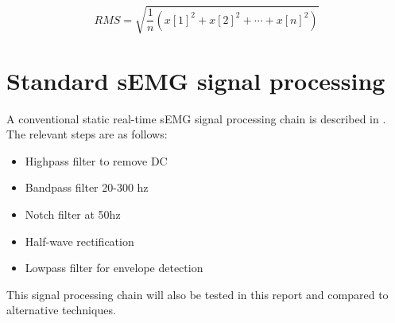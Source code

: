 \begin{equation}
    RMS = \sqrt{\frac{1}{n} (x[1]^2 + x[2]^2 + \cdots + x[n]^2)}
    \label{eq:rms}
\end{equation}

\section{Standard sEMG signal processing}\label{section:standard_semg_processing}
A conventional static real-time sEMG signal processing chain is described in \cite{muscle_force_estimation}. The relevant steps are as follows:
\begin{itemize}
    \item Highpass filter to remove DC
    \item Bandpass filter 20-300 hz
    \item Notch filter at 50hz
    \item Half-wave rectification
    \item Lowpass filter for envelope detection
\end{itemize}

This signal processing chain will also be tested in this report and compared to alternative techniques.